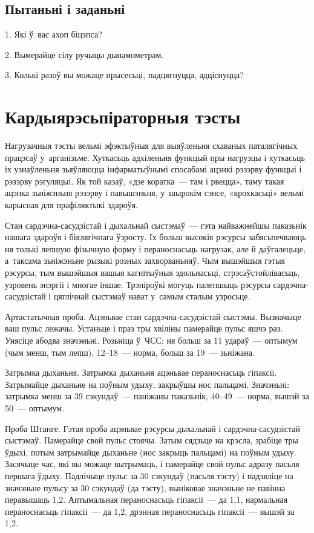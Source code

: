 \subsection*{Пытаньні і заданьні}

1. Які ў~вас ахоп біцэпса?

2. Вымерайце сілу ручыцы дынамометрам.

3. Колькі разоў вы можаце прысесьці, падцягнуцца, адціснуцца?


\section{Кардыярэсьпіраторныя тэсты}

Нагрузачныя тэсты вельмі эфэктыўныя для выяўленьня схаваных паталягічных працэсаў у~арганізьме. Хуткасьць адхіленьня функцый пры нагрузцы і хуткасьць іх узнаўленьня зьяўляюцца інфарматыўнымі спосабамі ацэнкі рэзэрву функцыі і рэзэрву рэгуляцыі. Як той казаў, «дзе коратка~--- там і рвецца», таму такая ацэнка зьніжэньня рэзэрву і павышэньня, у~шырокім сэнсе, «крохкасьці» вельмі карысная для прафіляктыкі здароўя.

Стан сардэчна-сасудзістай і дыхальнай сыстэмаў~--- гэта найважнейшы паказьнік нашага здароўя і біялягічнага ўзросту. Іх больш высокія рэсурсы забясьпечваюць ня толькі лепшую фізычную форму і пераноснасьць нагрузак, але й даўгалецьце, а~таксама зьніжэньне рызыкі розных захворваньняў. Чым вышэйшыя гэтыя рэсурсы, тым вышэйшыя вашыя кагнітыўныя здольнасьці, стрэсаўстойлівасьць, узровень энэргіі і многае іншае. Трэніроўкі могуць палепшыць рэсурсы сардэчна-сасудзістай і цяглічнай сыстэмаў нават у~самым сталым узросьце.

Артастатычная проба. Ацэньвае стан сардэчна-сасудзістай сыстэмы. Вызначыце ваш пульс лежачы. Устаньце і праз тры хвіліны памерайце пульс яшчэ раз. Унясіце абодва значэньні. Розьніца ў~ЧСС: ня больш за 11 удараў~--- оптымум (чым менш, тым лепш), 12--18~--- норма, больш за 19~--- зьніжана.

Затрымка дыханьня. Затрымка дыханьня ацэньвае пераноснасьць гіпаксіі. Затрымайце дыханьне на поўным удыху, закрыўшы нос пальцамі. Значэньні: затрымка менш за 39 сэкундаў~--- паніжаны паказьнік, 40--49~--- норма, вышэй за 50~--- оптымум.

Проба Штанге. Гэтая проба ацэньвае рэсурсы дыхальнай і сардэчна-сасудзістай сыстэмаў. Памерайце свой пульс стоячы. Затым сядзьце на крэсла, зрабіце тры ўдыхі, потым затрымайце дыханьне (нос закрыць пальцамі) на поўным удыху. Засячыце час, які вы можаце вытрымаць, і памерайце свой пульс адразу пасьля першага ўдыху. Падлічыце пульс за 30 сэкундаў (пасьля тэсту) і падзяліце на значэньне пульсу за 30 сэкундаў (да тэсту), выніковае значэньне не павінна перавышаць 1,2. Аптымальная пераноснасьць гіпаксіі~--- да 1,1, нармальная пераноснасьць гіпаксіі~--- да 1,2, дрэнная пераноснасьць гіпаксіі~--- вышэй за 1,2.

